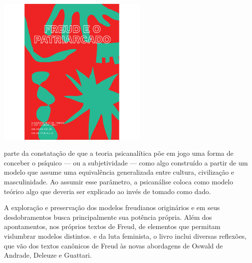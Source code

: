 \vfill

\hspace*{-.4cm}\begin{minipage}[c]{.5\linewidth}
\small{
{}}
\end{minipage}


\pagebreak


\begin{center}
\hspace*{.5cm}\includegraphics[width=74mm]{./grid/freud.png}
\end{center}

\hspace*{-7cm}\hrulefill\hspace*{-7cm}

\medskip

 parte da constatação de que a teoria psicanalítica põe em jogo uma forma de conceber o psíquico --- ou a subjetividade --- como algo construído a partir de um modelo que assume uma equivalência generalizada entre cultura, civilização e masculinidade. Ao assumir esse parâmetro, a psicanálise coloca como modelo teórico algo que deveria ser explicado ao invés de tomado como dado.

A exploração e preservação dos modelos freudianos originários e em seus desdobramentos busca principalmente sua potência própria. Além dos apontamentos, nos próprios textos de Freud, de elementos que permitam vislumbrar modelos distintos. 
 e da luta feminista, o livro inclui diversas reflexões, que vão dos textos canônicos de Freud às novas abordagens de Oswald de Andrade, Deleuze e Guattari.

